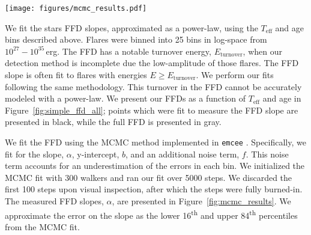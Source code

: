 \documentclass[twocolumn, linenumbers]{aastex631}
\begin{document}
\begin{figure*}[bht!]
    \begin{centering}
        \texttt{[image: figures/mcmc\_results.pdf]}
        \caption{
            Measured flare-frequency distribution slopes, $\alpha$, as a function of stellar effective temperature, $T_\textrm{eff}$ and age. We measured these FFDs with respect to flare
            energy. We find the FFD slopes as a function of energy are consistent with $\alpha = -0.6 ~\textrm{to} -0.2$ for stars $< 300$~Myr in TESS observations. A shallower FFD slope
            is indicative of more high-energy flares. We present all measured FFDs in Figure~\ref{appendix:supp_ffds}, and all measured slopes and errors in Table~\ref{tab:best_fits}.
            We find the shallowest slopes for stars $T_\textrm{eff} = 3400 - 4440$\,K, with a range from $\alpha = -0.44~ \textrm{to} -0.22$. We do not include the results for stars
            $T_\textrm{eff} = 3850 - 4440$\,K and $t_\textrm{age} = 20 - 40$\,Myr as this bin contained only six stars with detected flares. We present the average results of measured
            FFD slopes for the Hyades, Pleiades, and Praesepe clusters from \cite{ilin21} as black squares. We present the results of measured FFD slopes for all TESS primary mission
            targets in white circles \citep{Feinstein22} as ``field-age". We discuss what drives the difference between our sample and \cite{ilin21} in Section~\ref{subsec:energy_ffd}.
        }
        \label{fig:mcmc_results}
    \end{centering}
\end{figure*}

We fit the stars FFD slopes, approximated as a power-law, using the $T_\textrm{eff}$ and age bins described above. Flares were binned into 25 bins in log-space from $10^{27} - 10^{35}$\,erg.
The FFD has a notable turnover energy, $E_\textrm{turnover}$, when our detection method is incomplete due the low-amplitude of those flares. The FFD slope is often fit to flares with
energies $E \geq E_\textrm{turnover}$. We perform our fits following the same methodology. This turnover in the FFD cannot be accurately modeled with a power-law. We present our FFDs as a
function of $T_\textrm{eff}$ and age in Figure~\ref{fig:simple_ffd_all}; points which were fit to measure the FFD slope are presented in black, while the full FFD is presented in gray.

We fit the FFD using the MCMC method implemented in \texttt{emcee} \citep{goodman10, emcee}. Specifically, we fit for the slope, $\alpha$, y-intercept, $b$, and an additional noise term,
$f$. This noise term  accounts for an underestimation of the errors in each bin. We initialized the MCMC fit with 300 walkers and ran our fit over 5000 steps.  We discarded the first 100
steps upon visual inspection, after which the steps were fully burned-in. The measured FFD slopes, $\alpha$, are presented in Figure~\ref{fig:mcmc_results}. We approximate the error on the
slope as the lower 16\textsuperscript{th} and upper 84\textsuperscript{th} percentiles from the MCMC fit.
\end{document}
